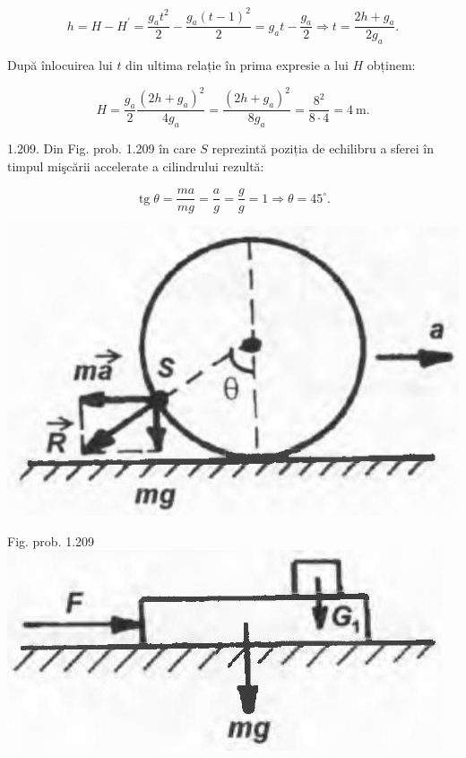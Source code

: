 \documentclass[10pt]{article}
\begin{document}
$$
h=H-H^{\prime}=\frac{g_{a} t^{2}}{2}-\frac{g_{a}(t-1)^{2}}{2}=g_{a} t-\frac{g_{a}}{2} \Rightarrow t=\frac{2 h+g_{a}}{2 g_{a}} .
$$

După înlocuirea lui $t$ din ultima relație în prima expresie a lui $H$ obținem:

$$
H=\frac{g_{a}}{2} \frac{\left(2 h+g_{a}\right)^{2}}{4 g_{a}}=\frac{\left(2 h+g_{a}\right)^{2}}{8 g_{a}}=\frac{8^{2}}{8 \cdot 4}=4 \mathrm{~m} .
$$

1.209. Din Fig. prob. 1.209 în care $S$ reprezintă poziția de echilibru a sferei în timpul mişcării accelerate a cilindrului rezultă:

$$
\operatorname{tg} \theta=\frac{m a}{m g}=\frac{a}{g}=\frac{g}{g}=1 \Rightarrow \theta=45^{\circ} .
$$

\begin{center}
\includegraphics[max width=\textwidth]{2025_07_01_5b3ff9fa0d508c8e9f17g-243}
\end{center}

Fig. prob. 1.209\\
\includegraphics[max width=\textwidth, center]{2025_07_01_5b3ff9fa0d508c8e9f17g-243(1)}
\end{document}
